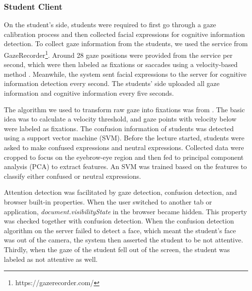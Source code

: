 \subsubsection{\textbf{Student Client}}
\label{subsubsec: student client}
On the student’s side, students were required to first go through a gaze calibration process and then collected facial expressions for cognitive information detection. To collect gaze information from the students, we used the service from GazeRecorder\footnote{https://gazerecorder.com/}. Around 28 gaze positions were provided from the service per second, which were then labeled as fixations or saccades using a velocity-based method \cite{engbert2003microsaccades}. Meanwhile, the system sent facial expressions to the server for cognitive information detection every second. The students' side uploaded all gaze information and cognitive information every five seconds.

The algorithm we used to transform raw gaze into fixations was from \cite{engbert2003microsaccades}. The basic idea was to calculate a velocity threshold, and gaze points with velocity below were labeled as fixations. 
%
The confusion information of students was detected using a support vector machine (SVM). Before the lecture started, students were asked to make confused expressions and neutral expressions. Collected data were cropped to focus on the eyebrow-eye region and then fed to principal component analysis (PCA) to extract features. An SVM was trained based on the features to classify either confused or neutral expressions.

Attention detection was facilitated by gaze detection, confusion detection, and browser built-in properties. When the user switched to another tab or application, \textit{document.visibilityState} in the browser became hidden. This property was checked together with confusion detection. When the confusion detection algorithm on the server failed to detect a face, which meant the student's face was out of the camera, the system then asserted the student to be not attentive. Thirdly, when the gaze of the student fell out of the screen, the student was labeled as not attentive as well. 

